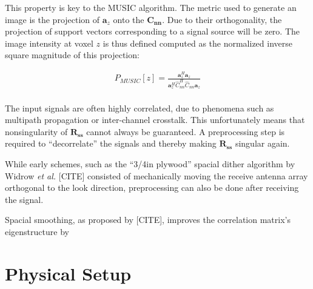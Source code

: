 This property is key to the MUSIC algorithm.
The metric used to generate an image is the projection of $\mathbf a_z$ onto the $\mathbf{C_{nn}}$.
Due to their orthogonality, the projection of support vectors corresponding to a signal source will be zero.
The image intensity at voxel $z$ is thus defined computed as the normalized inverse square magnitude of this projection:

\begin{align}
    P_{MUSIC}[z] = \frac{\mathbf{a}_z^H \mathbf{a}_z}{\mathbf{a}_z^H\hat C_{nn}^H\hat C_{nn}\mathbf{a}_z}
\end{align} \\

The input signals are often highly correlated, due to phenomena such as multipath propagation or inter-channel crosstalk.
This unfortunately means that nonsingularity of $\mathbf{R_{ss}}$ cannot always be guaranteed.
A preprocessing step is required to ``decorrelate'' the signals and thereby making $\mathbf{R_{ss}}$ singular again.

While early schemes, such as the ``3/4in plywood'' spacial dither algorithm by Widrow \textit{et al.} [CITE]
consisted of mechanically moving the receive antenna array orthogonal to the look direction,
preprocessing can also be done after receiving the signal.

Spacial smoothing, as proposed by [CITE], improves the correlation matrix's eigenstructure by

\section{Physical Setup}


